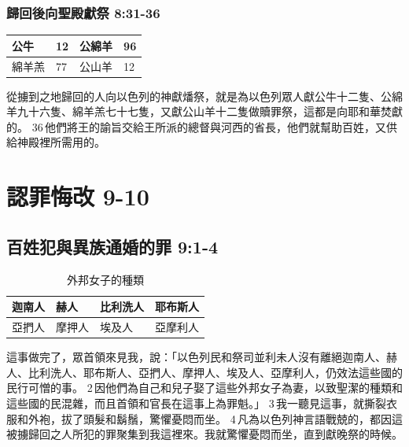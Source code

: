 \subsubsection{歸回後向聖殿獻祭 8:31-36}
\begin{table}[H]
\centering 
\begin{tabular}{p{1.5cm}|p{1.5cm}|p{1.5cm}|p{1.5cm}}\hline\hline
公牛 & 12 &公綿羊& 96 \\\hline
綿羊羔& 77&公山羊 &12  \\\hline
\end{tabular}
\end{table}
從擄到之地歸回的人向以色列的神獻燔祭，就是為以色列眾人獻公牛十二隻、公綿羊九十六隻、綿羊羔七十七隻，又獻公山羊十二隻做贖罪祭，這都是向耶和華焚獻的。 36 他們將王的諭旨交給王所派的總督與河西的省長，他們就幫助百姓，又供給神殿裡所需用的。

\section{認罪悔改 9-10}
\subsection{百姓犯與異族通婚的罪 9:1-4}
\begin{table}[!hbp]
\centering 
\begin{tabular}{|p{2cm}|p{2cm}|p{2cm}|p{2cm}|}
\hline
\hline
迦南人&赫人&比利洗人&耶布斯人\\\hline
亞捫人&摩押人&埃及人&亞摩利人\\\hline
\end{tabular}
\caption{外邦女子的種類}
\end{table}
這事做完了，眾首領來見我，說：「以色列民和祭司並利未人沒有離絕迦南人、赫人、比利洗人、耶布斯人、亞捫人、摩押人、埃及人、亞摩利人，仍效法這些國的民行可憎的事。 2 因他們為自己和兒子娶了這些外邦女子為妻，以致聖潔的種類和這些國的民混雜，而且首領和官長在這事上為罪魁。」 3 我一聽見這事，就撕裂衣服和外袍，拔了頭髮和鬍鬚，驚懼憂悶而坐。 4 凡為以色列神言語戰兢的，都因這被擄歸回之人所犯的罪聚集到我這裡來。我就驚懼憂悶而坐，直到獻晚祭的時候。


